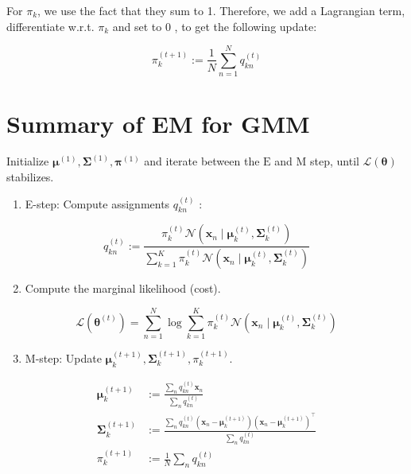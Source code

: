 \documentclass[10pt]{article}
\begin{document}
For $\pi_{k}$, we use the fact that they sum to 1. Therefore, we add a Lagrangian term, differentiate w.r.t. $\pi_{k}$ and set to 0 , to get the following update:

$$
\pi_{k}^{(t+1)}:=\frac{1}{N} \sum_{n=1}^{N} q_{k n}^{(t)}
$$

\section*{Summary of EM for GMM}
Initialize $\boldsymbol{\mu}^{(1)}, \boldsymbol{\Sigma}^{(1)}, \boldsymbol{\pi}^{(1)}$ and iterate between the $\mathrm{E}$ and $\mathrm{M}$ step, until $\mathcal{L}(\boldsymbol{\theta})$ stabilizes.

\begin{enumerate}
  \item E-step: Compute assignments $q_{k n}^{(t)}$ :
\end{enumerate}

$$
q_{k n}^{(t)}:=\frac{\pi_{k}^{(t)} \mathcal{N}\left(\mathbf{x}_{n} \mid \boldsymbol{\mu}_{k}^{(t)}, \boldsymbol{\Sigma}_{k}^{(t)}\right)}{\sum_{k=1}^{K} \pi_{k}^{(t)} \mathcal{N}\left(\mathbf{x}_{n} \mid \boldsymbol{\mu}_{k}^{(t)}, \boldsymbol{\Sigma}_{k}^{(t)}\right)}
$$

\begin{enumerate}
  \setcounter{enumi}{1}
  \item Compute the marginal likelihood (cost).
\end{enumerate}

$$
\mathcal{L}\left(\boldsymbol{\theta}^{(t)}\right)=\sum_{n=1}^{N} \log \sum_{k=1}^{K} \pi_{k}^{(t)} \mathcal{N}\left(\mathbf{x}_{n} \mid \boldsymbol{\mu}_{k}^{(t)}, \boldsymbol{\Sigma}_{k}^{(t)}\right)
$$

\begin{enumerate}
  \setcounter{enumi}{2}
  \item M-step: Update $\boldsymbol{\mu}_{k}^{(t+1)}, \boldsymbol{\Sigma}_{k}^{(t+1)}, \pi_{k}^{(t+1)}$.
\end{enumerate}

$$
\begin{aligned}
\boldsymbol{\mu}_{k}^{(t+1)} & :=\frac{\sum_{n} q_{k n}^{(t)} \mathbf{x}_{n}}{\sum_{n} q_{k n}^{(t)}} \\
\boldsymbol{\Sigma}_{k}^{(t+1)} & :=\frac{\sum_{n} q_{k n}^{(t)}\left(\mathbf{x}_{n}-\boldsymbol{\mu}_{k}^{(t+1)}\right)\left(\mathbf{x}_{n}-\boldsymbol{\mu}_{k}^{(t+1)}\right)^{\top}}{\sum_{n} q_{k n}^{(t)}} \\
\pi_{k}^{(t+1)} & :=\frac{1}{N} \sum_{n} q_{k n}^{(t)}
\end{aligned}
$$
\end{document}
